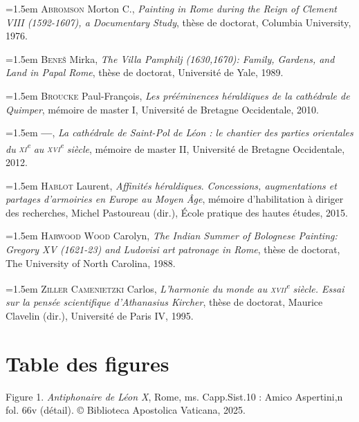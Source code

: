 \documentclass[12pt,twoside,openany]{book}
\newenvironment{PurhBibliography}
  {%
    \par
    \setlength{\parindent}{0pt}%
    \setlength{\leftskip}{0pt}%
  }
  {%
    \par
  }
\begin{document}
\begin{PurhBibliography}
\noindent\hangindent=1.5em \textsc{Abromson} Morton C., \textit{Painting in Rome during the Reign of Clement VIII (1592-1607), a Documentary Study}, thèse de doctorat, Columbia University, 1976.\par
\noindent\hangindent=1.5em \textsc{Beneš} Mirka, \textit{The Villa Pamphilj (1630,1670): Family, Gardens, and Land in Papal Rome}, thèse de doctorat, Université de Yale, 1989.\par
\noindent\hangindent=1.5em \textsc{Broucke} Paul-François, \textit{Les prééminences héraldiques de la cathédrale de Quimper}, mémoire de master I, Université de Bretagne Occidentale, 2010.\par
\noindent\hangindent=1.5em \textbf{—}, \textit{La cathédrale de Saint-Pol de Léon : le chantier des parties orientales du }\textit{\textsc{xi}}\textit{\textsuperscript{e}}\textit{ au }\textit{\textsc{xvi}}\textit{\textsuperscript{e}}\textit{ siècle}, mémoire de master \textsc{II}, Université de Bretagne Occidentale, 2012.\par
\noindent\hangindent=1.5em \textsc{Hablot} Laurent, \textit{Affinités héraldiques}. \textit{Concessions, augmentations et partages d’armoiries en Europe au Moyen Âge}, mémoire d’habilitation à diriger des recherches, Michel Pastoureau (dir.), École pratique des hautes études, 2015.\par
\noindent\hangindent=1.5em \textsc{Harwood Wood} Carolyn, \textit{The Indian Summer of Bolognese Painting: Gregory XV (1621-23) and Ludovisi art patronage in Rome}, thèse de doctorat, The University of North Carolina, 1988.\par
\noindent\hangindent=1.5em \textsc{Ziller Camenietzki} Carlos, \textit{L’harmonie du monde au }\textit{\textsc{xvii}}\textit{\textsuperscript{e}}\textit{ siècle. Essai sur la pensée scientifique d’Athanasius Kircher}, thèse de doctorat, Maurice Clavelin (dir.), Université de Paris \textsc{IV}, 1995.\par
\end{PurhBibliography}

\chapter*{Table des figures}

Figure 1. \textit{Antiphonaire de Léon X}, Rome, ms. Capp.Sist.10 : Amico Aspertini,n fol. 66v (détail). © Biblioteca Apostolica Vaticana, 2025.
\end{document}
